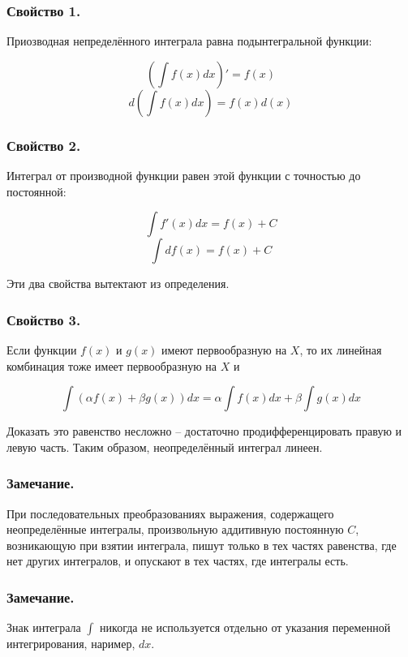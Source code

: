 \subsubsection{Свойство 1.}
Приозводная непределённого интеграла равна подынтегральной функции:

$$\left(\int f(x) dx \right)'=f(x)$$
$$d\left(\int f(x) dx \right)=f(x)d(x)$$

\subsubsection{Свойство 2.}
Интеграл от производной функции равен этой функции с точностью до постоянной:

$$\int f'(x)dx=f(x)+C$$
$$\int df(x)=f(x)+C$$

Эти два свойства вытектают из определения.

\subsubsection{Свойство 3.}
Если функции $f(x)$ и  $g(x)$ имеют первообразную на $X$, то их линейная комбинация тоже имеет первообразную на $X$ и 

$$\int(\alpha f(x) + \beta g(x))dx=\alpha \int f(x)dx+ \beta \int g(x)dx$$

Доказать это равенство несложно -- достаточно продифференцировать правую и левую часть.
Таким образом, неопределённый интеграл линеен.

\subsubsection{Замечание.}

При последовательных преобразованиях выражения, содержащего неопределённые интегралы, произвольную аддитивную постоянную $C$, возникающую при взятии интеграла, пишут только в тех частях равенства, где нет других интегралов, и опускают в тех частях, где интегралы есть.

\subsubsection{Замечание.}

Знак интеграла $\int$ никогда не используется отдельно от указания переменной интегрирования, наример, $dx$.


